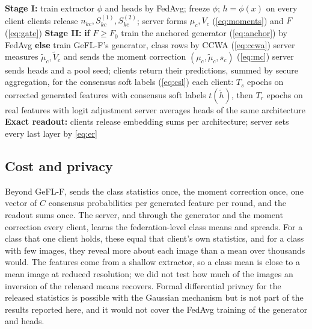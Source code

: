 \begin{algorithm}[t]
\caption{\ours (one run; all sums are computed by secure aggregation)}\label{alg:fedecs}
\begin{algorithmic}[1]
\State \textbf{Stage I:} train extractor $\phi$ and heads by FedAvg; freeze $\phi$; $h=\phi(x)$ on every client
\State clients release $n_{kc},S^{(1)}_{kc},S^{(2)}_{kc}$; server forms $\mu_c,V_c$ (\cref{eq:moments}) and $F$
(\cref{eq:gate})
\State \textbf{Stage II:} \textbf{if} $F\ge F_0$ train the anchored generator (\cref{eq:anchor}) by FedAvg
\textbf{else} train GeFL-F's generator, class rows by CCWA (\cref{eq:ccwa})
\State server measures $\tilde\mu_c,\tilde V_c$ and sends the moment correction $(\mu_c,\tilde\mu_c,s_c)$ (\cref{eq:mc})
 
  \State server sends heads and a pool seed; clients return their predictions, summed by secure aggregation, for the
  consensus soft labels (\cref{eq:csl})
  \State each client: $T_s$ epochs on corrected generated features with consensus soft labels $t(\tilde h)$, then $T_r$ epochs on
  real features with logit adjustment
  \State server averages heads of the same architecture
\EndFor
\State \textbf{Exact readout:} clients release embedding sums per architecture; server sets every last layer by
\cref{eq:er}
\end{algorithmic}
\end{algorithm}

\subsection{Cost and privacy}\label{sec:method-cost}

Beyond GeFL-F, \ours sends the class statistics once, the moment correction once, one vector of $C$ consensus
probabilities per generated feature per round, and the readout sums once.  The server, and through the generator and the moment correction every
client, learns the federation-level class means and spreads. For a class that one client holds, these equal that
client's own statistics, and for a class with few images, they reveal more about each image than a mean over
thousands would. The features come from a shallow extractor, so a class mean is close to a mean image at reduced
resolution; we did not test how much of the images an inversion of the released means recovers.
Formal differential privacy for the released statistics is possible with the Gaussian mechanism but is not part of the
results reported here, and it would not cover the FedAvg training of the generator and heads.
